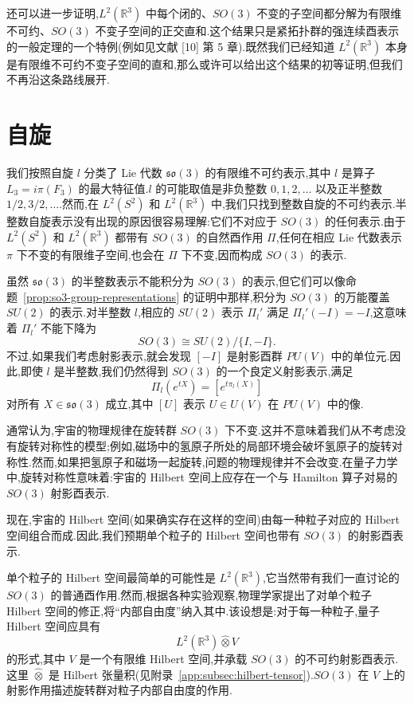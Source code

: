 还可以进一步证明,$L^2(\mathbb R^3)$ 中每个闭的、$SO(3)$ 不变的子空间都分解为有限维不可约、$SO(3)$ 不变子空间的正交直和.这个结果只是紧拓扑群的强连续酉表示的一般定理的一个特例(例如见文献 [10] 第 5 章).既然我们已经知道 $L^2(\mathbb R^3)$ 本身是有限维不可约不变子空间的直和,那么或许可以给出这个结果的初等证明,但我们不再沿这条路线展开.

\section{自旋}
\label{sec:spin}

我们按照自旋 $l$ 分类了 Lie 代数 $\mathfrak{so}(3)$ 的有限维不可约表示,其中 $l$ 是算子 $L_3=i\pi(F_3)$ 的最大特征值.$l$ 的可能取值是非负整数 $0,1,2,\ldots$ 以及正半整数 $1/2,3/2,\ldots$.然而,在 $L^2(S^2)$ 和 $L^2(\mathbb R^3)$ 中,我们只找到整数自旋的不可约表示.半整数自旋表示没有出现的原因很容易理解:它们不对应于 $SO(3)$ 的任何表示.由于 $L^2(S^2)$ 和 $L^2(\mathbb R^3)$ 都带有 $SO(3)$ 的自然酉作用 $\Pi$,任何在相应 Lie 代数表示 $\pi$ 下不变的有限维子空间,也会在 $\Pi$ 下不变,因而构成 $SO(3)$ 的表示.

虽然 $\mathfrak{so}(3)$ 的半整数表示不能积分为 $SO(3)$ 的表示,但它们可以像命题~\ref{prop:so3-group-representations} 的证明中那样,积分为 $SO(3)$ 的万能覆盖 $SU(2)$ 的表示.对半整数 $l$,相应的 $SU(2)$ 表示 $\Pi_l'$ 满足 $\Pi_l'(-I)=-I$,这意味着 $\Pi_l'$ 不能下降为
\[
 SO(3)\cong SU(2)/\{I,-I\}.
\]
不过,如果我们考虑射影表示,就会发现 $[-I]$ 是射影酉群 $PU(V)$ 中的单位元.因此,即使 $l$ 是半整数,我们仍然得到 $SO(3)$ 的一个良定义射影表示,满足
\[
 \Pi_l(e^{tX})=[e^{t\pi_l(X)}]
\]
对所有 $X\in\mathfrak{so}(3)$ 成立,其中 $[U]$ 表示 $U\in U(V)$ 在 $PU(V)$ 中的像.

通常认为,宇宙的物理规律在旋转群 $SO(3)$ 下不变.这并不意味着我们从不考虑没有旋转对称性的模型;例如,磁场中的氢原子所处的局部环境会破坏氢原子的旋转对称性.然而,如果把氢原子和磁场一起旋转,问题的物理规律并不会改变.在量子力学中,旋转对称性意味着:宇宙的 Hilbert 空间上应存在一个与 Hamilton 算子对易的 $SO(3)$ 射影酉表示.

现在,宇宙的 Hilbert 空间(如果确实存在这样的空间)由每一种粒子对应的 Hilbert 空间组合而成.因此,我们预期单个粒子的 Hilbert 空间也带有 $SO(3)$ 的射影酉表示.

单个粒子的 Hilbert 空间最简单的可能性是 $L^2(\mathbb R^3)$,它当然带有我们一直讨论的 $SO(3)$ 的普通酉作用.然而,根据各种实验观察,物理学家提出了对单个粒子 Hilbert 空间的修正,将“内部自由度”纳入其中.该设想是:对于每一种粒子,量子 Hilbert 空间应具有
\[
 L^2(\mathbb R^3)\widehat\otimes V
\]
的形式,其中 $V$ 是一个有限维 Hilbert 空间,并承载 $SO(3)$ 的不可约射影酉表示.这里 $\widehat\otimes$ 是 Hilbert 张量积(见附录~\ref{app:subsec:hilbert-tensor}).$SO(3)$ 在 $V$ 上的射影作用描述旋转群对粒子内部自由度的作用.

